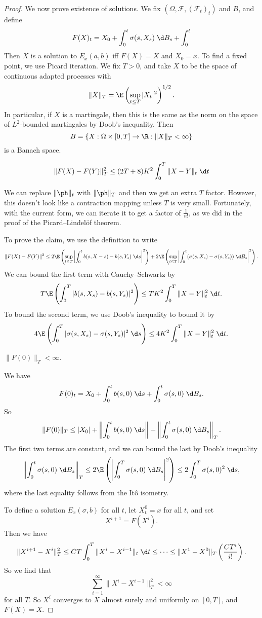\documentclass[a4paper]{article}
\begin{document}
\begin{proof}
  We now prove existence of solutions. We fix $(\Omega, \mathcal{F}, (\mathcal{F}_t)_t)$ and $B$, and define
  \[
    F(X)_t = X_0 + \int_0^t \sigma(s, X_s)\;\d B_s + \int_0^t 
  \]
  Then $X$ is a solution to $E_x(a, b)$ iff $F(X) = X$ and $X_0 = x$. To find a fixed point, we use Picard iteration. We fix $T > 0$, and take $X$ to be the space of continuous adapted processes with
  \[
    \|X\|_T = \E\left(\sup_{t \leq T} |X_t|^2\right)^{1/2}.
  \]
  In particular, if $X$ is a martingale, then this is the same as the norm on the space of $L^2$-bounded martingales by Doob's inequality. Then
  \[
    B = \{X: \Omega \times [0, T] \to \R: \|X\|_T < \infty\}
  \]
  is a Banach space.
  \begin{claim}
    \[
      \|F(X) - F(Y)\|_T^2 \leq (2T + 8)K^2 \int_0^T \|X - Y\|_t \;\d t
    \]
  \end{claim}
  We can replace $\|\ph\|_t$ with $\|\ph\|_T$ and then we get an extra $T$ factor. However, this doesn't look like a contraction mapping unless $T$ is very small. Fortunately, with the current form, we can iterate it to get a factor of $\frac{1}{n!}$, as we did in the proof of the Picard--Lindel\"of theorem.

  To prove the claim, we use the definition to write
  \[
    \|F(X) - F(Y)\|^2 \leq 2 \E \left(\sup_{t \leq T} \left|\int_0^t b(s, X-s) - b(s, Y_s)\;\d s\right|^2\right) + 2 \E \left(\sup_{t \leq T} \left|\int_0^t(\sigma(s, X_s) - \sigma(s, Y_s))\;\d B_s\right|^2\right).
  \]
  We can bound the first term with Cauchy--Schwartz by
  \[
    T \E \left(\int_0^T |b(s, X_s) - b(s, Y_s)|^2 \right) \leq TK^2 \int_0^T \|X -Y \|_t^2 \;\d t.
  \]
  To bound the second term, we use Doob's inequality to bound it by
  \[
    4 \E \left(\int_0^T |\sigma(s, X_s) - \sigma(s, Y_s)|^2 \;\d s\right) \leq 4K^2 \int_0^T \|X - Y\|_t^2\;\d t.
  \]
  \begin{claim}
    $\|F(0)\|_T < \infty$.
  \end{claim}
  We have
  \[
    F(0)_t = X_0 + \int_0^t b(s, 0)\;\d s + \int_0^t \sigma(s, 0)\;\d B_s.
  \]
  So
  \[
    \|F(0)\|_T \leq |X_0| + \left\| \int_0^t b(s, 0) \;\d s\right\| + \left\| \int_0^t \sigma(s, 0) \;\d B_s\right\|_T.
  \]
  The first two terms are constant, and we can bound the last by Doob's inequality
  \[
    \left\| \int_0^t \sigma(s, 0) \;\d B_s\right\|_T \leq 2 \E \left(\left|\int_0^T \sigma(s, 0) \;\d B_s\right|^2\right) \leq 2 \int_0^T \sigma(s, 0)^2 \;\d s,
  \]
  where the last equality follows from the It\^o isometry.

  To define a solution $E_x(\sigma, b)$ for all $t$, let $X_t^0 = x$ for all $t$, and set
  \[
    X^{i + 1} = F(X^i).
  \]
  Then we have
  \[
    \|X^{i + 1} - X^i\|_T^2 \leq CT \int_0^T \|X^i - X^{i - 1}\|_t \;\d t \leq \cdots \leq \|X^1 - X^0\|_T \left(\frac{CT^i}{i!}\right).
  \]
  So we find that
  \[
    \sum_{i = 1}^\infty \|X^i - X^{i - 1}\|_T^2 < \infty
  \]
  for all $T$. So $X^i$ converges to $X$ almost surely and uniformly on $[0, T]$, and $F(X) = X$.
\end{proof}
\end{document}

